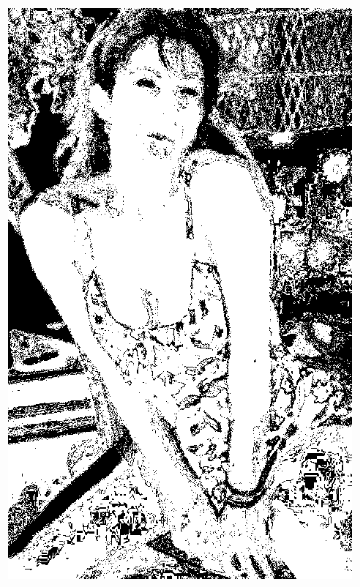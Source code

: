 \begin{figure}[h]
{\begin{subfigure}[b]{0.23\textwidth}
         \includegraphics[width=\textwidth]{images/results/cross_st/linda_rgb_dark_light_bayes.png}
     \end{subfigure}}
     

\end{figure}

